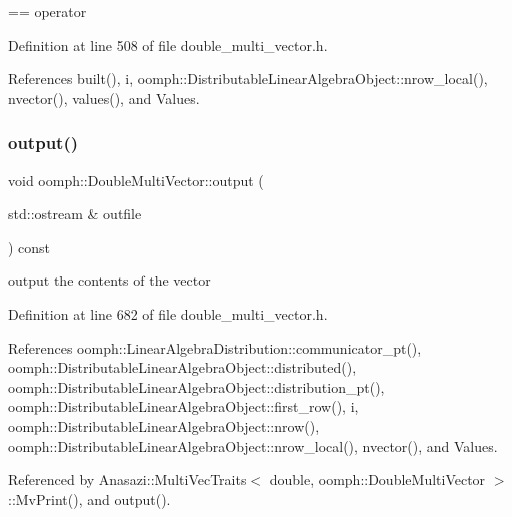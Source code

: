 == operator 



Definition at line 508 of file double\+\_\+multi\+\_\+vector.\+h.



References built(), i, oomph\+::\+Distributable\+Linear\+Algebra\+Object\+::nrow\+\_\+local(), nvector(), values(), and Values.

\mbox{\label{classoomph_1_1DoubleMultiVector_a0dbfe401ddb32b128f01fd3bb4755c4f}} 
\subsubsection{\texorpdfstring{output()}{output()}\hspace{0.1cm}{\footnotesize\ttfamily [1/2]}}
{\footnotesize\ttfamily void oomph\+::\+Double\+Multi\+Vector\+::output (\begin{DoxyParamCaption}\item[{std\+::ostream \&}]{outfile }\end{DoxyParamCaption}) const\hspace{0.3cm}{\ttfamily [inline]}}



output the contents of the vector 



Definition at line 682 of file double\+\_\+multi\+\_\+vector.\+h.



References oomph\+::\+Linear\+Algebra\+Distribution\+::communicator\+\_\+pt(), oomph\+::\+Distributable\+Linear\+Algebra\+Object\+::distributed(), oomph\+::\+Distributable\+Linear\+Algebra\+Object\+::distribution\+\_\+pt(), oomph\+::\+Distributable\+Linear\+Algebra\+Object\+::first\+\_\+row(), i, oomph\+::\+Distributable\+Linear\+Algebra\+Object\+::nrow(), oomph\+::\+Distributable\+Linear\+Algebra\+Object\+::nrow\+\_\+local(), nvector(), and Values.



Referenced by Anasazi\+::\+Multi\+Vec\+Traits$<$ double, oomph\+::\+Double\+Multi\+Vector $>$\+::\+Mv\+Print(), and output().

\mbox{\label{classoomph_1_1DoubleMultiVector_ae465b1dd1100941eb39e7604cab5175d}} 
